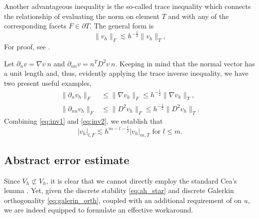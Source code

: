 \documentclass[11pt]{article}
\theoremstyle{remark}
\newcommand{\abs}[1]{\left\lvert #1 \right\rvert}
\renewcommand{\le}{\leqslant}
\numberwithin{equation}{section}
\begin{document}
Another advantageous inequality is the so-called trace inequality which connects the relationship of evaluating the norm on element $ T $ and with any of the corresponding facets $F \in \partial T$. The general form is
\begin{equation}
    \label{eq:inv2}
\| v_{h} \|_{F   }^{  }  \lesssim
h^{-\frac{1}{2}} \| v_{h} \|_{ T  }^{  },
\end{equation}
For proof, see \cite[Lemma 12.8]{ErnGuermond2021}.

Let $\partial _{n} v = \nabla v \ n$ and $\partial_{nn} v = n^{T} D^2 v \ n $. Keeping in mind that the normal vector has a unit length and, thus, evidently applying the
trace inverse inequality, we have two present useful examples,
\begin{equation}
    \label{eq:fund_inv_est}
\begin{split}
    \| \partial _{n} v_{h} \|_{F  }^{  }  & \le \| \nabla v_{h} \|_{F  }^{  }  \le h^{-\frac{1}{2}} \| \nabla  v_{h} \|_{T  }^{  },  \\
    \| \partial _{nn} v_{h} \|_{ F }^{  } & \le  \| D^2 v_{h} \|_{ F }^{  }   \le  h^{-\frac{1}{2}} \| D^2 v_{h} \|_{ T }^{  }.
\end{split}
\end{equation}
Combining \eqref{eq:inv1} and \eqref{eq:inv2}, we establish that
\begin{equation}
    \label{eq:general}
\abs{ v_{h} }_{l,F}  \lesssim h^{m-l - \frac{1}{2}} \abs{ v_{h} }_{m, T}
\text{ for } l \le m.
\end{equation}

\subsection{Abstract error estimate}%
\label{sub:ceas_lemma}

Since $V_{h} \not \subset V_{h}$, it is clear that we cannot directly employ the standard Cea's lemma \cite[p. 66]{quartdiff}. Yet, given the discrete stability \eqref{eq:ah_star} and discrete Galerkin orthogonality \eqref{eq:galerin_orth}, coupled with an additional
requirement of on $u$, we are indeed equipped to formulate an effective workaround.
\end{document}
